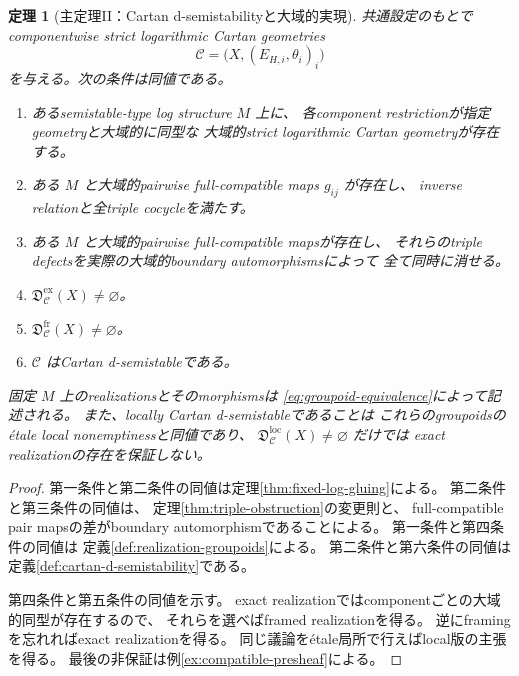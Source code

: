 \documentclass[uplatex,dvipdfmx,11pt]{jsarticle}
\numberwithin{equation}{section}
\theoremstyle{plain}
\newtheorem{theorem}{定理}[section]
\theoremstyle{definition}
\theoremstyle{remark}
\newcommand{\calC}{\mathcal C}
\newcommand{\calD}{\mathfrak D}
\begin{document}
\begin{theorem}[主定理II：Cartan d-semistabilityと大域的実現]
\label{thm:cartan-d-semistability}
共通設定のもとでcomponentwise strict logarithmic Cartan geometries
\[
\calC=\bigl(X,(E_{H,i},\theta_i)_i\bigr)
\]
を与える。次の条件は同値である。
\begin{enumerate}
\item
あるsemistable-type log structure \(M\) 上に、
各component restrictionが指定geometryと大域的に同型な
大域的strict logarithmic Cartan geometryが存在する。

\item
ある \(M\) と大域的pairwise full-compatible maps \(g_{ij}\) が存在し、
inverse relationと全triple cocycleを満たす。

\item
ある \(M\) と大域的pairwise full-compatible mapsが存在し、
それらのtriple defectsを実際の大域的boundary automorphismsによって
全て同時に消せる。

\item
\(\calD_{\calC}^{\mathrm{ex}}(X)\ne\varnothing\)。

\item
\(\calD_{\calC}^{\mathrm{fr}}(X)\ne\varnothing\)。

\item
\(\calC\) はCartan d-semistableである。
\end{enumerate}

固定 \(M\) 上のrealizationsとそのmorphismsは
\eqref{eq:groupoid-equivalence}によって記述される。
また、locally Cartan d-semistableであることは
これらのgroupoidsのétale local nonemptinessと同値であり、
\(\calD_{\calC}^{\mathrm{loc}}(X)\ne\varnothing\) だけでは
exact realizationの存在を保証しない。
\end{theorem}

\begin{proof}
第一条件と第二条件の同値は定理\ref{thm:fixed-log-gluing}による。
第二条件と第三条件の同値は、
定理\ref{thm:triple-obstruction}の変更則と、
full-compatible pair mapsの差がboundary automorphismであることによる。
第一条件と第四条件の同値は
定義\ref{def:realization-groupoids}による。
第二条件と第六条件の同値は
定義\ref{def:cartan-d-semistability}である。

第四条件と第五条件の同値を示す。
exact realizationではcomponentごとの大域的同型が存在するので、
それらを選べばframed realizationを得る。
逆にframingを忘れればexact realizationを得る。
同じ議論をétale局所で行えばlocal版の主張を得る。
最後の非保証は例\ref{ex:compatible-presheaf}による。
\end{proof}
\end{document}
